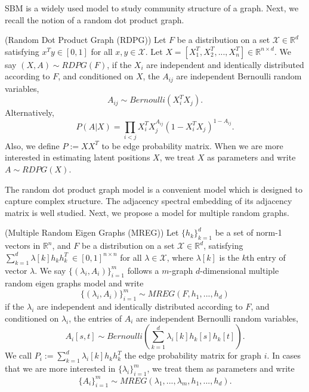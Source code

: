 \documentclass[10pt,journal,compsoc]{IEEEtran}
\newenvironment{definition}[1][Definition]{\begin{trivlist}
		\item[\hskip \labelsep {\bfseries #1}]}{\end{trivlist}}
\begin{document}
\noindent SBM is a widely used model to study community structure of a graph\cite{karrer2011stochastic}\cite{lyzinski2015community}. Next, we recall the notion of a random dot product graph\cite{young2007random}. 

\begin{definition} (Random Dot Product Graph (RDPG)) Let $F$ be a distribution on a set $\mathcal{X} \in \mathbb{R}^d$ satisfying $x^T y \in [0, 1]$ for all $x, y \in \mathcal{X}$. Let $X=[X_1^T,X_2^T,...,X_n^T] \in \mathbb{R}^{n \times d}$. We say $(X,A) \sim RDPG(F)$, if the $X_i$ are independent and identically distributed according to $F$, and conditioned on $X$, the $A_{ij}$ are independent Bernoulli random variables,
\[ A_{ij} \sim Bernoulli(X_i^T X_j). \]
Alternatively,
\[ P(A|X) = \prod_{i<j} X_i^T X_j ^{ A_{ij}} (1-X_i^T X_j)^{1- A_{ij}}.\]
Also, we define $P:=XX^T$ to be edge probability matrix. When we are more interested in estimating latent positions $X$, we treat $X$ as parameters and write $A \sim RDPG(X)$.
\end{definition}
The random dot product graph model is a convenient model which is designed to capture complex structure. The adjacency
spectral embedding of its adjacency matrix is well studied\cite{sussman2014consistent}. Next, we propose a model for multiple random graphs.
\begin{definition} (Multiple Random Eigen Graphs (MREG)) Let $\{h_k\}_{k=1}^{d}$ be a set of norm-1 vectors in $\mathbb{R}^{n}$, and  $F$ be a distribution on a set $\mathcal{X} \in \mathbb{R}^d$,  satisfying $\sum\limits_{k=1}^{d} \lambda [k] h_k  h_k^T \  \in [0, 1]^{n \times n} $ for all $\lambda \in \mathcal{X}$, where $\lambda[k]$ is the $k$th entry of vector $\lambda$. We say $\{(\lambda_i,A_i)\}_{i=1}^{m}$ follows a $m$-graph $d$-dimensional multiple random eigen graphs model and write
\[\{(\lambda_i,A_i)\}_{i=1}^{m} \sim MREG(F,h_1,...,h_d)\]
if the $\lambda_i$ are independent and identically distributed according to $F$, and conditioned on $\lambda_i$, the entries of $A_i$ are independent Bernoulli random variables,
\[ A_{i}[s,t] \sim Bernoulli( \sum_{k=1}^{d} \lambda_{i}[k] h_{k} [s] h_{k} [t] ). \]
We call $P_i:=\sum_{k=1}^{d} \lambda_i [k] h_k  h_k^T$ the edge probability matrix for graph $i$. In cases that we are more interested in $\{\lambda_i\}_{i=1}^m$, we treat them as parameters and write 
\[\{A_i\}_{i=1}^{m} \sim MREG(\lambda_1,...,\lambda_m,h_1,...,h_d).\] 
\end{definition}
\end{document}
